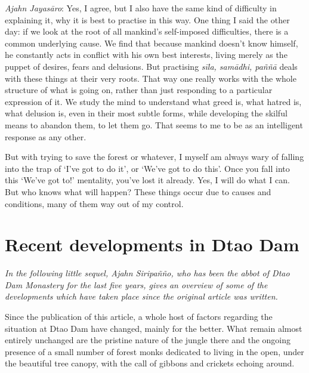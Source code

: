 \emph{Ajahn Jayasāro}: Yes, I agree, but I also have the same kind of
difficulty in explaining it, why it is best to practise in this way. One
thing I said the other day: if we look at the root of all mankind's
self-imposed difficulties, there is a common underlying cause. We find
that because mankind doesn't know himself, he constantly acts in
conflict with his own best interests, living merely as the puppet of
desires, fears and delusions. But practising \emph{sīla, samādhi, paññā}
deals with these things at their very roots. That way one really works
with the whole structure of what is going on, rather than just
responding to a particular expression of it. We study the mind to
understand what greed is, what hatred is, what delusion is, even in
their most subtle forms, while developing the skilful means to abandon
them, to let them go. That seems to me to be as an intelligent response
as any other. 

But with trying to save the forest or whatever, I myself am always wary
of falling into the trap of `I've got to do it', or `We've got to do
this'. Once you fall into this `We've got to!' mentality, you've lost it
already. Yes, I will do what I can. But who knows what will happen? 
These things occur due to causes and conditions, many of them way out of
my control. 

\clearpage

\section{Recent developments in Dtao Dam}

\emph{In the following little sequel, Ajahn Siripañño, who has been the
abbot of Dtao Dam Monastery for the last five years, gives an overview
of some of the developments which have taken place since the original
article was written.}

Since the publication of this article, a whole host of factors regarding
the situation at Dtao Dam have changed, mainly for the better. What
remain almost entirely unchanged are the pristine nature of the jungle
there and the ongoing presence of a small number of forest monks
dedicated to living in the open, under the beautiful tree canopy, with
the call of gibbons and crickets echoing around. 

